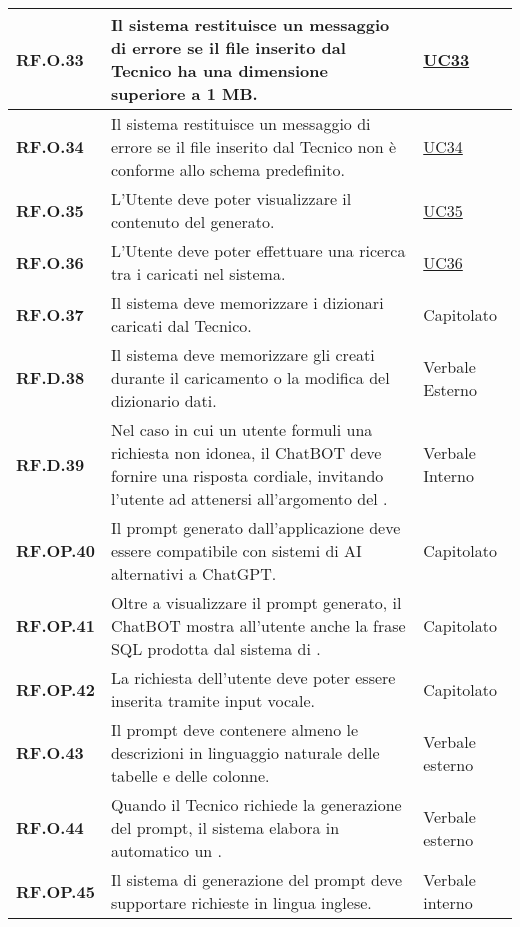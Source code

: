 \begin{longtable}{|P{3cm}|P{6,5cm}|>{\arraybackslash}P{4cm}|}
    \hline
    \textbf{RF.O.33} & Il sistema restituisce un messaggio di errore se il file inserito dal Tecnico ha una dimensione superiore a 1 MB. & \hyperref[UC33]{UC33} \\
    \hline
    \textbf{RF.O.34} & Il sistema restituisce un messaggio di errore se il file inserito dal Tecnico non è conforme allo schema predefinito. & \hyperref[UC34]{UC34} \\
    \hline
    \textbf{RF.O.35} & L'Utente deve poter visualizzare il contenuto del  generato. & \hyperref[UC35]{UC35} \\
    \hline
    \textbf{RF.O.36} & L'Utente deve poter effettuare una ricerca tra i  caricati nel sistema. & \hyperref[UC36]{UC36} \\
    \hline
    \textbf{RF.O.37} & Il sistema deve memorizzare i dizionari caricati dal Tecnico. & Capitolato \\
    \hline
    \textbf{RF.D.38} & Il sistema deve memorizzare gli  creati durante il caricamento o la modifica del dizionario dati. & Verbale Esterno\\
    \hline
    \textbf{RF.D.39} & Nel caso in cui un utente formuli una richiesta non idonea, il ChatBOT deve fornire una risposta cordiale, invitando l'utente ad attenersi all'argomento del . & Verbale Interno \\
    \hline
    \textbf{RF.OP.40} & Il prompt generato dall'applicazione deve essere compatibile con sistemi di AI alternativi a ChatGPT. & Capitolato \\
    \hline
    \textbf{RF.OP.41} & Oltre a visualizzare il prompt generato, il ChatBOT mostra all'utente anche la frase SQL prodotta dal sistema di . & Capitolato \\
    \hline
    \textbf{RF.OP.42} & La richiesta dell'utente deve poter essere inserita tramite input vocale. & Capitolato \\
    \hline
    \textbf{RF.O.43} & Il prompt deve contenere almeno le descrizioni in linguaggio naturale delle tabelle e delle colonne. & Verbale esterno\\
    \hline
    \textbf{RF.O.44} & Quando il Tecnico richiede la generazione del prompt, il sistema elabora in automatico un . & Verbale esterno \\
    \hline
    \textbf{RF.OP.45} & Il sistema di generazione del prompt deve supportare richieste in lingua inglese. & Verbale interno \\

\end{longtable}
